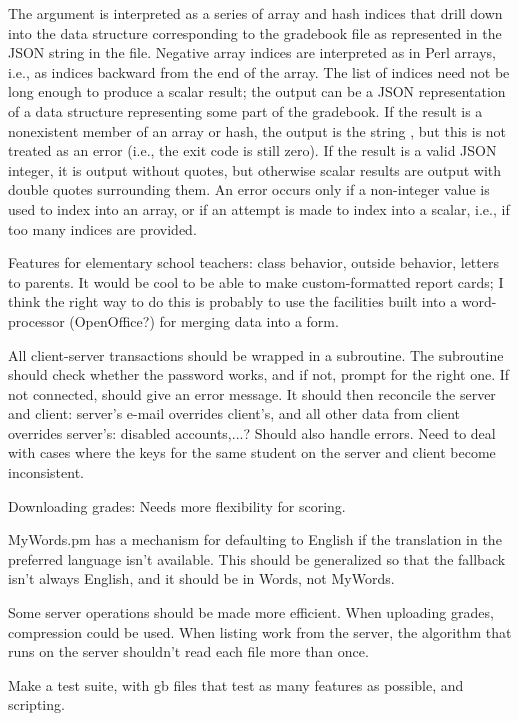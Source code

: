 \documentclass{opengrade_doc}
\begin{document}
The argument is interpreted as a series of array and hash indices
that drill down into the data structure corresponding to the gradebook
file as represented in the JSON string in the file. Negative array indices
are interpreted as in Perl arrays, i.e., as indices backward from the end
of the array. The list of indices need not be long enough to produce a
scalar result; the output can be a JSON representation of a data structure
representing some part of the gradebook. If the result is a nonexistent member
of an array or hash,
the output is the string \verb@null@, but this is not treated as an error
(i.e., the exit code is still zero). If the result is a valid JSON
integer, it is output without quotes, but otherwise scalar results
are output with double quotes surrounding them. An error occurs only if
a non-integer value is used to index into an array, or if an attempt
is made to index into a scalar, i.e., if too many indices are provided.

\label{improve}
Features for elementary school teachers: class behavior, outside behavior,
letters to parents.
It would be cool to be able to make custom-formatted report cards; I think
the right way to do this is probably to use the facilities built into
a word-processor (OpenOffice?)
for merging data into a form.

All client-server transactions should be wrapped in a subroutine. The
subroutine should check whether the password works, and if not, prompt
for the right one. If not connected, should give an error message.
It should then reconcile the server and client:
server's e-mail overrides client's, and all other data from client
overrides server's: disabled accounts,...? Should also handle errors.
Need to deal with cases where the keys for the same student on the server
and client become inconsistent.

Downloading grades: Needs more flexibility
for scoring.

MyWords.pm has a mechanism for defaulting to English if the translation
in the preferred language isn't available. This should be generalized
so that the fallback isn't always English, and it should be in
Words, not MyWords.

Some server operations should be made more efficient. When uploading
grades, compression could be used. When listing work from the server,
the algorithm that runs on the server shouldn't read each file more
than once.

Make a test suite, with gb files that test as many features as possible,
and scripting.
\end{document}
